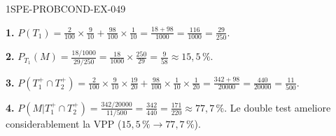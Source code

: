 \begin{corrige}{1SPE-PROBCOND-EX-049}

\textbf{1.} $P(T_1) = \frac{2}{100}\times\frac{9}{10}+\frac{98}{100}\times\frac{1}{10} = \frac{18+98}{1000} = \frac{116}{1000} = \frac{29}{250}$.

\textbf{2.} $P_{T_1}(M) = \frac{18/1000}{29/250} = \frac{18}{1000}\times\frac{250}{29} = \frac{9}{58} \approx 15{,}5\,\%$.

\textbf{3.} $P(T_1^+ \cap T_2^+) = \frac{2}{100}\times\frac{9}{10}\times\frac{19}{20}+\frac{98}{100}\times\frac{1}{10}\times\frac{1}{20} = \frac{342+98}{20000} = \frac{440}{20000} = \frac{11}{500}$.

\textbf{4.} $P(M|T_1^+ \cap T_2^+) = \frac{342/20000}{11/500} = \frac{342}{440} = \frac{171}{220} \approx 77{,}7\,\%$. Le double test ameliore considerablement la VPP ($15{,}5\,\% \to 77{,}7\,\%$).

\end{corrige}
